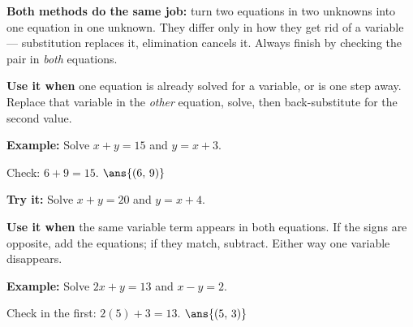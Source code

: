 \documentclass[12pt]{article}
\begin{document}

\begin{formulabox}
\textbf{Both methods do the same job:} turn two equations in two unknowns into
one equation in one unknown. They differ only in how they get rid of a
variable --- substitution replaces it, elimination cancels it. Always finish by
checking the pair in \emph{both} equations.
\end{formulabox}


\begin{formulabox}
\textbf{Use it when} one equation is already solved for a variable, or is one
step away. Replace that variable in the \emph{other} equation, solve, then
back-substitute for the second value.
\end{formulabox}

\begin{examplebox}
\textbf{Example:} \quad Solve $x + y = 15$ and $y = x + 3$.

Check: $6 + 9 = 15$. \quad $\ans{(6,\, 9)}$
\end{examplebox}

\begin{tryitbox}
\textbf{Try it:} \quad Solve $x + y = 20$ and $y = x + 4$.\\[2pt]
\end{tryitbox}


\begin{formulabox}
\textbf{Use it when} the same variable term appears in both equations. If the
signs are opposite, add the equations; if they match, subtract. Either way one
variable disappears.
\end{formulabox}

\begin{examplebox}
\textbf{Example:} \quad Solve $2x + y = 13$ and $x - y = 2$.

Check in the first: $2(5) + 3 = 13$. \quad $\ans{(5,\, 3)}$
\end{examplebox}
\end{document}
